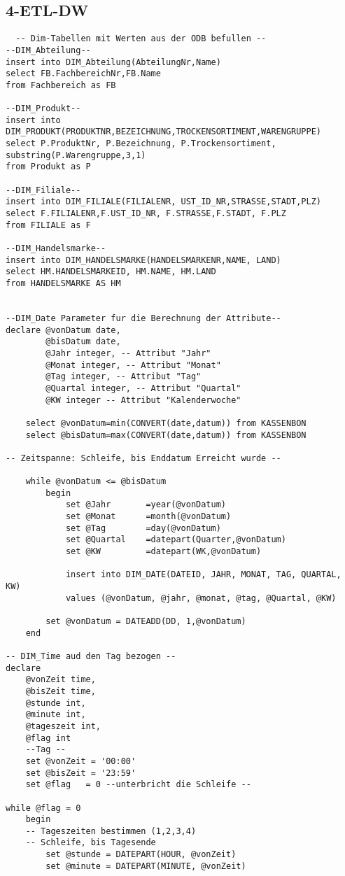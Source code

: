 \subsection{4-ETL-DW}

\begin{lstlisting}
  -- Dim-Tabellen mit Werten aus der ODB befullen --
--DIM_Abteilung--
insert into DIM_Abteilung(AbteilungNr,Name)
select FB.FachbereichNr,FB.Name
from Fachbereich as FB

--DIM_Produkt--
insert into DIM_PRODUKT(PRODUKTNR,BEZEICHNUNG,TROCKENSORTIMENT,WARENGRUPPE)
select P.ProduktNr, P.Bezeichnung, P.Trockensortiment, substring(P.Warengruppe,3,1)
from Produkt as P

--DIM_Filiale--
insert into DIM_FILIALE(FILIALENR, UST_ID_NR,STRASSE,STADT,PLZ)
select F.FILIALENR,F.UST_ID_NR, F.STRASSE,F.STADT, F.PLZ
from FILIALE as F

--DIM_Handelsmarke--
insert into DIM_HANDELSMARKE(HANDELSMARKENR,NAME, LAND)
select HM.HANDELSMARKEID, HM.NAME, HM.LAND
from HANDELSMARKE AS HM


--DIM_Date Parameter fur die Berechnung der Attribute--
declare @vonDatum date,
		@bisDatum date,
		@Jahr integer, -- Attribut "Jahr"
		@Monat integer, -- Attribut "Monat"
		@Tag integer, -- Attribut "Tag"
		@Quartal integer, -- Attribut "Quartal"
		@KW integer -- Attribut "Kalenderwoche"

	select @vonDatum=min(CONVERT(date,datum)) from KASSENBON
	select @bisDatum=max(CONVERT(date,datum)) from KASSENBON

-- Zeitspanne: Schleife, bis Enddatum Erreicht wurde --

	while @vonDatum <= @bisDatum
		begin
			set @Jahr		=year(@vonDatum)
			set @Monat		=month(@vonDatum)
			set @Tag		=day(@vonDatum)
			set @Quartal	=datepart(Quarter,@vonDatum)
			set @KW			=datepart(WK,@vonDatum)

			insert into DIM_DATE(DATEID, JAHR, MONAT, TAG, QUARTAL, KW)
			values (@vonDatum, @jahr, @monat, @tag, @Quartal, @KW)

		set @vonDatum = DATEADD(DD, 1,@vonDatum)
	end

-- DIM_Time aud den Tag bezogen --
declare
	@vonZeit time,
	@bisZeit time,
	@stunde int,
	@minute int,
	@tageszeit int,
	@flag int
    --Tag --
	set @vonZeit = '00:00'
	set @bisZeit = '23:59'
	set @flag	= 0 --unterbricht die Schleife --

while @flag = 0
	begin
    -- Tageszeiten bestimmen (1,2,3,4)
    -- Schleife, bis Tagesende
		set @stunde = DATEPART(HOUR, @vonZeit)
		set @minute = DATEPART(MINUTE, @vonZeit)


\end{lstlisting}
